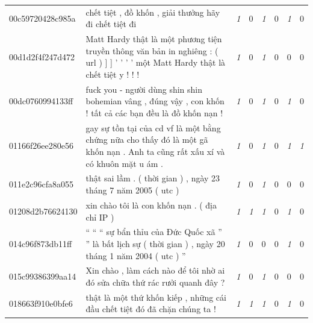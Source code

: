 \begin{table}[htb!]
{\begin{minipage}{0.88\textheight}
\begin{threeparttable}
\begin{tabularx}{\textwidth}{L{0.95} L{6.25} C{0.135} C{0.135} C{0.135} C{0.135} C{0.135} C{0.135}}
                    00c59720428c985a & chết tiệt , đồ khốn , giải thưởng hãy đi chết tiệt đi                                                                             & \textit{1}  & 0           & \textit{1}  & 0           & \textit{1}  & 0           \\
                    00d1d2f4f247d472 & Matt Hardy thật là một phương tiện truyền thông văn bản in nghiêng : ( url ) ] ] ' ' ' ' một Matt Hardy thật là chết tiệt y ! ! ! & \textit{1}  & 0           & \textit{1}  & 0           & 0           & 0           \\
                    00dc0760994133ff & fuck you - người dùng shin shin bohemian vâng , đúng vậy , con khốn ! tất cả các bạn đều là đồ khốn nạn !                         & \textit{1}  & 0           & \textit{1}  & 0           & \textit{1}  & 0           \\
                    01166f26ee280e56 & gay sự tồn tại của cd vf là một bằng chứng nữa cho thấy đó là một gã khốn nạn . Anh ta cũng rất xấu xí và có khuôn mặt u ám .     & \textit{1}  & 0           & \textit{1}  & 0           & \textit{1}  & \textit{1}  \\
                    011e2c96cfa8a055 & thật sai lầm . ( thời gian ) , ngày 23 tháng 7 năm 2005 ( utc )                                                                   & \textit{1}  & 0           & \textit{1}  & 0           & 0           & 0           \\
                    01208d2b76624130 & xin chào tôi là con khốn nạn . ( địa chỉ IP )                                                                                     & \textit{1}  & \textit{1}  & \textit{1}  & 0           & \textit{1}  & 0           \\
                    014c96f873db11ff & `` `` `` sự bẩn thỉu của Đức Quốc xã '' '' là bất lịch sự ( thời gian ) , ngày 20 tháng 1 năm 2004 ( utc ) ''                     & \textit{1}  & 0           & 0           & 0           & \textit{1}  & 0           \\
                    015c99386399aa14 & Xin chào , làm cách nào để tôi nhờ ai đó sửa chữa thứ rác rưởi quanh đây ?                                                        & \textit{1}  & 0           & \textit{1}  & 0           & 0           & 0           \\
                    018663f910e0bfe6 & thật là một thứ khốn kiếp , những cái đầu chết tiệt đó đã chặn chúng ta !                                                         & \textit{1}  & \textit{1}  & \textit{1}  & 0           & \textit{1}  & 0           \\

\end{tabularx}
\end{threeparttable}
\end{minipage}}
\end{table}
